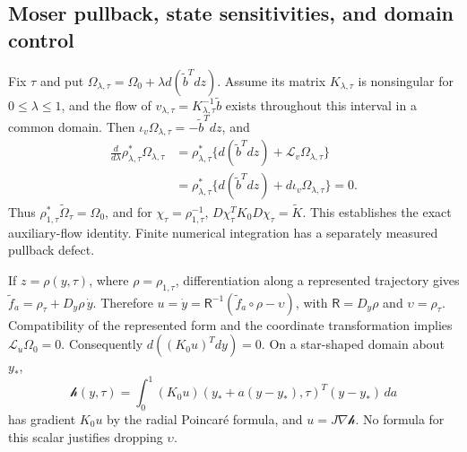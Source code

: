 \subsection{Moser pullback, state sensitivities, and domain control}
Fix $\tau$ and put $\Omega_{\lambda,\tau}=\Omega_0+\lambda d(\widetilde b^Tdz)$. Assume its matrix $K_{\lambda,\tau}$ is nonsingular for $0\le\lambda\le1$, and the flow of $v_{\lambda,\tau}=K_{\lambda,\tau}^{-1}\widetilde b$ exists throughout this interval in a common domain. Then $\iota_v\Omega_{\lambda,\tau}=-\widetilde b^Tdz$, and
\begin{align}
 \frac{d}{d\lambda}\rho_{\lambda,\tau}^*\Omega_{\lambda,\tau}
 &=\rho_{\lambda,\tau}^*
   \{d(\widetilde b^Tdz)+\mathcal L_v\Omega_{\lambda,\tau}\}\\
 &=\rho_{\lambda,\tau}^*\{d(\widetilde b^Tdz)+d\iota_v\Omega_{\lambda,\tau}\}=0.
 \label{eq:sup-moser-proof}
\end{align}
Thus $\rho_{1,\tau}^*\widetilde\Omega_\tau=\Omega_0$, and for $\chi_\tau=\rho_{1,\tau}^{-1}$, $D\chi_\tau^TK_0D\chi_\tau=\widetilde K$. This establishes the exact auxiliary-flow identity. Finite numerical integration has a separately measured pullback defect.

If $z=\rho(y,\tau)$, where $\rho=\rho_{1,\tau}$, differentiation along a represented trajectory gives
$\widetilde f_a=\rho_\tau+D_y\rho\,\dot y$. Therefore $u=\dot y=\mathsf R^{-1}(\widetilde f_a\circ\rho-\upsilon)$, with $\mathsf R=D_y\rho$ and $\upsilon=\rho_\tau$. Compatibility of the represented form and the coordinate transformation implies $\mathcal L_u\Omega_0=0$. Consequently $d((K_0u)^Tdy)=0$. On a star-shaped domain about $y_*$,
\begin{equation}
 \mathcal h(y,\tau)=\int_0^1 (K_0u)(y_*+a(y-y_*),\tau)^T(y-y_*)\,da
 \label{eq:sup-chart-hamiltonian}
\end{equation}
has gradient $K_0u$ by the radial Poincar\'e formula, and $u=J\nabla\mathcal h$. No formula for this scalar justifies dropping $\upsilon$.

